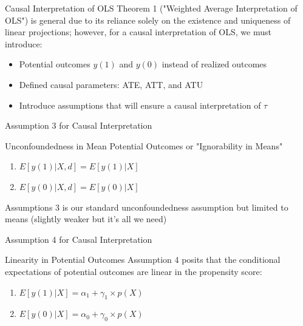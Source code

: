 \documentclass{beamer}
\begin{document}
\begin{frame}{Causal Interpretation of OLS}
  Theorem 1 ("Weighted Average Interpretation of OLS") is general due to its reliance solely on the existence and uniqueness of linear projections; however, for a causal interpretation of OLS, we must introduce:
  \begin{itemize}
    \item Potential outcomes \( y(1) \) and \( y(0) \) instead of realized outcomes
    \item Defined causal parameters: ATE, ATT, and ATU
    \item Introduce assumptions that will ensure a causal interpretation of \( \tau \)
  \end{itemize}
\end{frame}

\begin{frame}{Assumption 3 for Causal Interpretation}
  \begin{block}{Unconfoundedness in Mean Potential Outcomes or "Ignorability in Means"}
    \begin{enumerate}
      \item \( E [y(1) | X, d] = E[y(1) | X] \)
      \item \( E[y(0) | X, d] = E[y(0) | X] \)
    \end{enumerate}
  \end{block}
  Assumptions 3 is our standard unconfoundedness assumption but limited to means (slightly weaker but it's all we need)
\end{frame}

\begin{frame}{Assumption 4 for Causal Interpretation}
  \begin{block}{Linearity in Potential Outcomes}
    Assumption 4 posits that the conditional expectations of potential outcomes are linear in the propensity score:
    \begin{enumerate}
      \item \( E[y(1) | X] = \alpha_1 + \gamma_1 \times p(X) \)
      \item \( E[y(0) | X] = \alpha_0 + \gamma_0 \times p(X) \)
    \end{enumerate}
  \end{block}
\end{frame}
\end{document}
